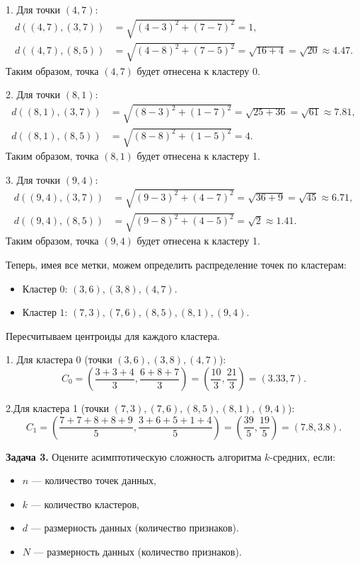 1. Для точки \((4, 7)\):
\[
\begin{aligned}
d((4, 7), (3, 7)) &= \sqrt{(4-3)^2 + (7-7)^2} = 1, \\ d((4, 7), (8, 5)) &= \sqrt{(4-8)^2 + (7-5)^2} = \sqrt{16 + 4} = \sqrt{20} \approx 4.47.
\end{aligned}
\]
Таким образом, точка \((4, 7)\) будет отнесена к кластеру 0.

2. Для точки \((8, 1)\):
\[
\begin{aligned}
d((8, 1), (3, 7)) &= \sqrt{(8-3)^2 + (1-7)^2} = \sqrt{25 + 36} = \sqrt{61} \approx 7.81, \\
d((8, 1), (8, 5)) &= \sqrt{(8-8)^2 + (1-5)^2} = 4.
\end{aligned}
\]
Таким образом, точка \((8, 1)\) будет отнесена к кластеру 1.

3. Для точки \((9, 4)\):
\[
\begin{aligned}
d((9, 4), (3, 7)) &= \sqrt{(9-3)^2 + (4-7)^2} = \sqrt{36 + 9} = \sqrt{45} \approx 6.71, \\
d((9, 4), (8, 5)) &= \sqrt{(9-8)^2 + (4-5)^2} = \sqrt{2} \approx 1.41.
\end{aligned}
\]
Таким образом, точка \((9, 4)\) будет отнесена к кластеру 1.

Теперь, имея все метки, можем определить распределение точек по кластерам:
\begin{itemize}
    \item Кластер \(0\): \((3, 6), (3, 8), (4, 7)\).
    \item Кластер \(1\): \((7, 3), (7, 6), (8, 5), (8, 1), (9, 4)\).
\end{itemize}
Пересчитываем центроиды для каждого кластера.

1. Для кластера 0 (точки \((3, 6), (3, 8), (4, 7)\)):
\[
C_0 = \left( \frac{3+3+4}{3}, \frac{6+8+7}{3} \right) = \left( \frac{10}{3}, \frac{21}{3} \right) = (3.33, 7).
\]

2.Для кластера 1 (точки \((7, 3), (7, 6), (8, 5), (8, 1), (9, 4)\)):
\[
C_1 = \left( \frac{7+7+8+8+9}{5}, \frac{3+6+5+1+4}{5} \right) = \left( \frac{39}{5}, \frac{19}{5} \right) = (7.8, 3.8).
\]

\textbf{Задача 3.}
Оцените асимптотическую сложность алгоритма \(k\)-средних, если:
\begin{itemize}
    \item \(n\) — количество точек данных,
    \item \(k\) — количество кластеров,
    \item \(d\) — размерность данных (количество признаков).
    \item \(N\) — размерность данных (количество признаков).
\end{itemize}

